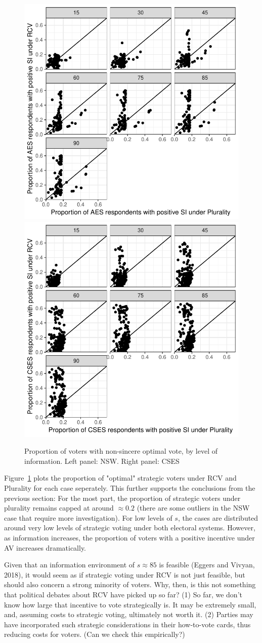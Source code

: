 \documentclass[11pt, letter, margin = 2 in]{article}
\begin{document}
\begin{figure}[!h]
	\centering
	\includegraphics[width = .45 \textwidth]{"../output/figures/australia_sv_prop"}
	\includegraphics[width = .45 \textwidth]{"../output/figures/cses_prop"}
	\caption{Proportion of voters with non-sincere optimal vote, by level of information. Left panel: NSW. Right panel: CSES}
	\label{fig:sv_dist}
\end{figure}

Figure~\ref{fig:sv_dist} plots the proportion of "optimal" strategic voters under RCV and Plurality for each case seperately. This further supports the conclusions from the previous section: For the most part, the proportion of strategic voters under plurality remains capped at around $\approx 0.2$ (there are some outliers in the NSW case that require more investigation). For low levels of $s$, the cases are distributed around very low levels of strategic voting under both electoral systems. However, as information increases, the proportion of voters with a positive incentive under AV increases dramatically.

Given that an information environment of $s \approx 85$ is feasible (Eggers and Vivyan, 2018), it would seem as if strategic voting under RCV is not just feasible, but should also concern a strong minority of voters. Why, then, is this not something that political debates about RCV have picked up so far? (1) So far, we don't know how large that incentive to vote strategically is. It may be extremely small, and, assuming costs to strategic voting, ultimately not worth it. (2) Parties may have incorporated such strategic considerations in their how-to-vote cards, thus reducing costs for voters. (Can we check this empirically?)
\end{document}
